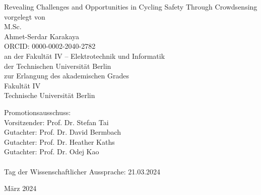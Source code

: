 
\thispagestyle{empty}
\begin{center}
    \huge{Revealing Challenges and Opportunities in Cycling Safety Through Crowdsensing}\\[2pc]
    
    \large{vorgelegt von}\\
    \large{M.Sc.}\\
    \large{Ahmet-Serdar Karakaya}\\
    \large{ORCID: 0000-0002-2040-2782}\\[2pc]


    an der Fakultät IV – Elektrotechnik und Informatik\\
    der Technischen Universität Berlin\\
    zur Erlangung des akademischen Grades\\
    Fakultät IV\\
    Technische Universität Berlin
\end{center}
Promotionsausschuss:\\
Vorsitzender: Prof. Dr. Stefan Tai\\
Gutachter: Prof. Dr. David Bermbach\\
Gutachter: Prof. Dr. Heather Kaths\\
Gutachter: Prof. Dr. Odej Kao\\
\\
Tag der Wissenschaftlicher Aussprache: 21.03.2024\\
\begin{center}
März 2024
\end{center}

\afterpage{\null\thispagestyle{empty}\newpage}
